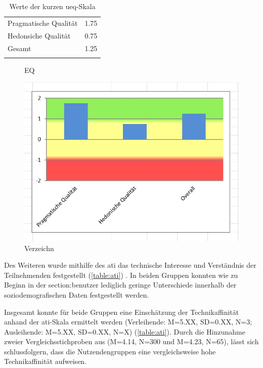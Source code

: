 \begin{table}[h]
  \centering
  \caption{Werte der kurzen \ac{ueq}-Skala}
  \begin{tabular}{lc}
    \arrayrulecolor{maincolor}\hline
    Pragmatische Qualität & 1.75 \\
    Hedonsiche Qualität   & 0.75 \\
    Gesamt                & 1.25 \\
    \arrayrulecolor{maincolor}\hline
  \end{tabular}
  \label{table:ueq}
\end{table}

\begin{figure}[h]
  \centering
  \caption{EQ}
  \includegraphics[scale=0.7]{Bilder/Screenshot 2022-10-26 165800.jpg}
  \caption[UEQ]{Verzeichn}
  \label{fig:ueq}
\end{figure}

Des Weiteren wurde mithilfe des \ac{ati} das technische Interesse und
Verständnis der Teilnehmenden festgestellt (\ref{table:ati})
\cite{attig_assessing_2017}. In beiden Gruppen konnten wie zu Beginn in der
\refname{section:benutzer} lediglich geringe Unterschiede innerhalb der
soziodemografischen Daten festgestellt werden.

Insgesamt konnte für beide Gruppen eine Einschätzung der Technikaffinität anhand
der \ac{ati}-Skala ermittelt werden (Verleihende: M=5.XX, SD=0.XX, N=3;
Ausleihende: M=5.XX, SD=0.XX, N=X) (\ref{table:ati}). Durch die Hinzunahme
zweier Vergleichsstichproben aus  (M=4.14, N=300 und
M=4.23, N=65), lässt sich schlussfolgern, dass die Nutzendengruppen eine
vergleichsweise hohe Technikaffinität aufweisen.


